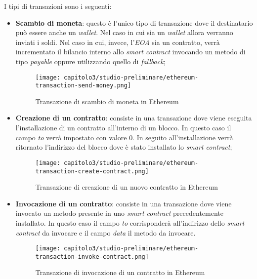 \noindent I tipi di transazioni sono i seguenti:
\begin{itemize}
  \item \textbf{Scambio di moneta}: questo è l'unico tipo di transazione dove il destinatario può essere anche un \textit{wallet}. Nel caso in cui sia un \textit{wallet} allora verranno inviati i soldi. Nel caso in cui, invece, l'\textit{EOA} sia un contratto, verrà incrementato il bilancio interno allo \textit{smart contract} invocando un metodo di tipo \textit{payable} oppure utilizzando quello di \textit{fallback};
  
  \begin{figure}[h!]
    \centering
    \texttt{[image: capitolo3/studio-preliminare/ethereum-transaction-send-money.png]}
    \caption{Transazione di scambio di moneta in Ethereum}
  \end{figure}

  \item \textbf{Creazione di un contratto}: consiste in una transazione dove viene eseguita l'installazione di un contratto all'interno di un blocco. In questo caso il campo \textit{to} verrà impostato con valore 0. In seguito all'installazione verrà ritornato l'indirizzo del blocco dove è stato installato lo \textit{smart contract};
  
  \begin{figure}[h!]
    \centering
    \texttt{[image: capitolo3/studio-preliminare/ethereum-transaction-create-contract.png]}
    \caption{Transazione di creazione di un nuovo contratto in Ethereum}
  \end{figure}
  
  \item \textbf{Invocazione di un contratto}: consiste in una transazione dove viene invocato un metodo presente in uno \textit{smart contract} precedentemente installato. In questo caso il campo \textit{to} corrisponderà all'indirizzo dello \textit{smart contract} da invocare e il campo \textit{data} il metodo da invocare.
  
  \begin{figure}[h!]
    \centering
    \texttt{[image: capitolo3/studio-preliminare/ethereum-transaction-invoke-contract.png]}
    \caption{Transazione di invocazione di un contratto in Ethereum}
  \end{figure}
\end{itemize}

